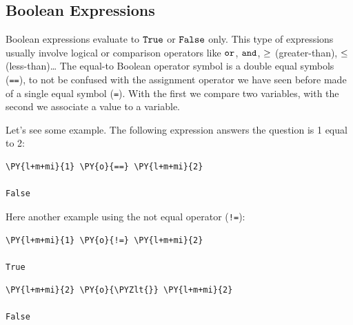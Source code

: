 \subsection{Boolean Expressions}\label{boolean-expressions}

Boolean expressions evaluate to \(\tt{True}\) or \(\tt{False}\) only. This type
of expressions usually involve logical or comparison operators like \(\tt{or}\), \(\tt{and}\), $\tt{\geq}$ (greater-than), $\tt{\leq}$ (less-than)\ldots
The equal-to Boolean operator symbol is a double equal symbols (\texttt{==}), to not be confused with the assignment operator we have seen before made of a single equal symbol (\texttt{=}). With the first we compare two variables, with the second we associate a value to a variable.

Let's see some example. The following expression answers the question is 1 equal to 2:

\begin{tcolorbox}[breakable, size=fbox, boxrule=1pt, pad at break*=1mm, colback=cellbackground, colframe=cellborder]
\begin{Verbatim}[commandchars=\\\{\}]
\PY{l+m+mi}{1} \PY{o}{==} \PY{l+m+mi}{2} 

False
\end{Verbatim}
\end{tcolorbox}

Here another example using the not equal operator (\texttt{!=}):

\begin{tcolorbox}[breakable, size=fbox, boxrule=1pt, pad at break*=1mm, colback=cellbackground, colframe=cellborder]
\begin{Verbatim}[commandchars=\\\{\}]
\PY{l+m+mi}{1} \PY{o}{!=} \PY{l+m+mi}{2}
  
True
\end{Verbatim}
\end{tcolorbox}

\begin{tcolorbox}[breakable, size=fbox, boxrule=1pt, pad at break*=1mm, colback=cellbackground, colframe=cellborder]
\begin{Verbatim}[commandchars=\\\{\}]
\PY{l+m+mi}{2} \PY{o}{\PYZlt{}} \PY{l+m+mi}{2}

False
\end{Verbatim}
\end{tcolorbox}

